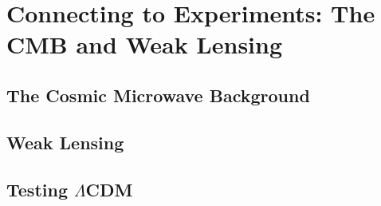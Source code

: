 \chapter{Connecting to Experiments: The CMB and Weak Lensing}
\section{The Cosmic Microwave Background}
\section{Weak Lensing}
\section{Testing $\Lambda$CDM}